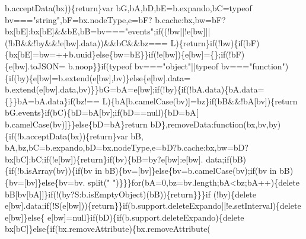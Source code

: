\begin{DoxyCode}
      b.acceptData(bx))\{\textcolor{keywordflow}{return}\}var bG,bA,bD,bE=b.expando,bC=typeof bv===\textcolor{stringliteral}{"string"},bF=bx.nodeType,e=bF?
      b.cache:bx,bw=bF?bx[bE]:bx[bE]&&bE,bB=bv===\textcolor{stringliteral}{"events"};\textcolor{keywordflow}{if}((!bw||!e[bw]||(!bB&&!by&&!e[bw].data))&&bC&&bz===
      L)\{\textcolor{keywordflow}{return}\}\textcolor{keywordflow}{if}(!bw)\{\textcolor{keywordflow}{if}(bF)\{bx[bE]=bw=++b.uuid\}\textcolor{keywordflow}{else}\{bw=bE\}\}\textcolor{keywordflow}{if}(!e[bw])\{e[bw]=\{\};\textcolor{keywordflow}{if}(!bF)\{e[bw].toJSON=
      b.noop\}\}\textcolor{keywordflow}{if}(typeof bv===\textcolor{stringliteral}{"object"}||typeof bv===\textcolor{stringliteral}{"function"})\{\textcolor{keywordflow}{if}(by)\{e[bw]=b.extend(e[bw],bv)\}\textcolor{keywordflow}{else}\{e[bw].data=
      b.extend(e[bw].data,bv)\}\}bG=bA=e[bw];\textcolor{keywordflow}{if}(!by)\{\textcolor{keywordflow}{if}(!bA.data)\{bA.data=\{\}\}bA=bA.data\}\textcolor{keywordflow}{if}(bz!==
      L)\{bA[b.camelCase(bv)]=bz\}\textcolor{keywordflow}{if}(bB&&!bA[bv])\{\textcolor{keywordflow}{return} bG.events\}\textcolor{keywordflow}{if}(bC)\{bD=bA[bv];\textcolor{keywordflow}{if}(bD==null)\{bD=bA[
      b.camelCase(bv)]\}\}\textcolor{keywordflow}{else}\{bD=bA\}\textcolor{keywordflow}{return} bD\},removeData:\textcolor{keyword}{function}(bx,bv,by)\{\textcolor{keywordflow}{if}(!b.acceptData(bx))\{\textcolor{keywordflow}{return}\}var bB,
      bA,bz,bC=b.expando,bD=bx.nodeType,e=bD?b.cache:bx,bw=bD?bx[bC]:bC;\textcolor{keywordflow}{if}(!e[bw])\{\textcolor{keywordflow}{return}\}\textcolor{keywordflow}{if}(bv)\{bB=by?e[bw]:e[bw].
      data;\textcolor{keywordflow}{if}(bB)\{\textcolor{keywordflow}{if}(!b.isArray(bv))\{\textcolor{keywordflow}{if}(bv in bB)\{bv=[bv]\}\textcolor{keywordflow}{else}\{bv=b.camelCase(bv);\textcolor{keywordflow}{if}(bv in bB)\{bv=[bv]\}\textcolor{keywordflow}{else}\{bv=bv.
      split(\textcolor{stringliteral}{" "})\}\}\}\textcolor{keywordflow}{for}(bA=0,bz=bv.length;bA<bz;bA++)\{\textcolor{keyword}{delete} bB[bv[bA]]\}\textcolor{keywordflow}{if}(!(by?S:b.isEmptyObject)(bB))\{\textcolor{keywordflow}{return}\}\}\}\textcolor{keywordflow}{if}
      (!by)\{\textcolor{keyword}{delete} e[bw].data;\textcolor{keywordflow}{if}(!S(e[bw]))\{\textcolor{keywordflow}{return}\}\}\textcolor{keywordflow}{if}(b.support.deleteExpando||!e.setInterval)\{\textcolor{keyword}{delete} e[bw]\}\textcolor{keywordflow}{else}\{
      e[bw]=null\}\textcolor{keywordflow}{if}(bD)\{\textcolor{keywordflow}{if}(b.support.deleteExpando)\{\textcolor{keyword}{delete} bx[bC]\}\textcolor{keywordflow}{else}\{\textcolor{keywordflow}{if}(bx.removeAttribute)\{bx.removeAttribute(

\end{DoxyCode}
